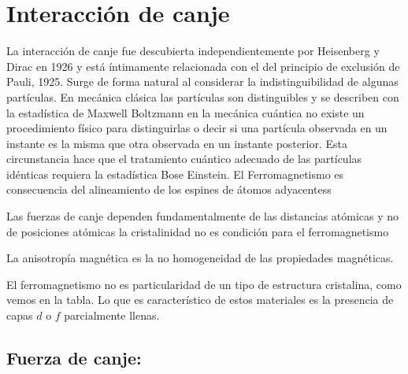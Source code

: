 \section{Interacción de canje}


La interacción de canje fue descubierta independientemente por Heisenberg y Dirac en 1926 y está íntimamente relacionada con el del principio de exclusión de Pauli, 1925. Surge de forma natural al considerar la indistinguibilidad de algunas partículas. En mecánica clásica las partículas son distinguibles y se describen con la estadística de Maxwell Boltzmann en la mecánica cuántica no existe un procedimiento físico para distinguirlas o decir si una partícula observada en un instante es la misma que otra observada en un instante posterior. Esta circunstancia hace que el tratamiento cuántico adecuado de las partículas idénticas requiera la estadística Bose Einstein. El Ferromagnetismo es consecuencia del alineamiento de los espines de átomos adyacentess

Las fuerzas de canje dependen fundamentalmente de las distancias atómicas y no de posiciones atómicas la cristalinidad no es condición para el ferromagnetismo

La anisotropía magnética es la no homogeneidad de las propiedades magnéticas.

El ferromagnetismo no es particularidad de un tipo de estructura cristalina,
como vemos en la tabla. Lo que es característico de estos materiales es la presencia de capas $d$ o $f$ parcialmente llenas.


\subsection{Fuerza de canje:}

